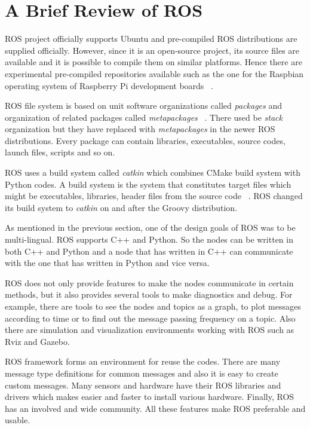 \section{A Brief Review of ROS}
\label{sec:brief review of ros}
ROS project officially supports Ubuntu and pre-compiled ROS distributions are supplied officially. However, since it is an open-source project, its source files are available and it is possible to compile them on similar platforms. Hence there are experimental pre-compiled repositories available such as the one for the Raspbian operating system of Raspberry Pi development boards ~\cite{rosRaspbian}.
\par
ROS file system is based on unit software organizations called \textit{packages} and organization of related packages called \textit{metapackages} ~\cite{rosFileSystem}. There used be \textit{stack} organization but they have replaced with \textit{metapackages} in the newer ROS distributions. Every package can contain libraries, executables, source codes, launch files, scripts and so on. 
\par
ROS uses a build system called \textit{catkin} which combines CMake build system with Python codes. A build system is the system that constitutes target files which might be executables, libraries, header files from the source code ~\cite{rosCatkin}. ROS changed its build system to \textit{catkin} on and after the Groovy distribution. 
\par
As mentioned in the previous section, one of the design goals of ROS was to be multi-lingual. ROS supports C++ and Python. So the nodes can be written in both C++ and Python and a node that has written in C++ can communicate with the one that has written in Python and vice versa. 
\par
ROS does not only provide features to make the nodes communicate in certain methods, but it also provides several tools to make diagnostics and debug. For example, there are tools to see the nodes and topics as a graph, to plot messages according to time or to find out the message passing frequency on a topic. Also there are simulation and visualization environments working with ROS such as Rviz and Gazebo. 
\par
ROS framework forms an environment for reuse the codes. There are many message type definitions for common messages and also it is easy to create custom messages. Many sensors and hardware have their ROS libraries and drivers which makes easier and faster to install various hardware. Finally, ROS has an involved and wide community. All these features make ROS preferable and usable. 

